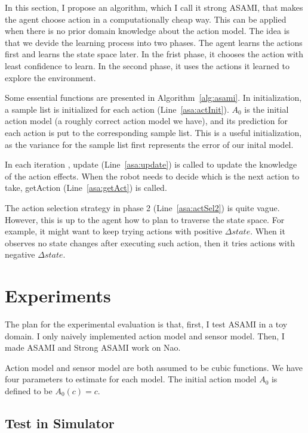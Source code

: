 \documentclass[10pt]{IEEEtran}
\begin{document}
In this section, I propose an algorithm, which I call it strong ASAMI,
that makes the agent choose action in a computationally cheap way.
This can be applied when there is no prior domain knowledge about
the action model. The idea is that we devide the learning process into two
phases. The agent learns the actions first and learns the state space
later. In the frist phase, it chooses the action with least confidence
to learn. In the second phase, it uses the actions it learned to
explore the environment.

Some essential functions are presented in Algorithm~\ref{alg:asami}.
In initialization, a sample list is initialized for each action
(Line~\ref{asa:actInit}). $A_0$ is the initial action model (a roughly
correct action model we have), and its prediction for each action is
put to the corresponding sample list.  This is a useful
initialization, as the variance for the sample list first represents
the error of our inital model.

In each iteration , update (Line~\ref{asa:update}) is called to update
the knowledge of the action effects. When the robot needs to decide which
is the next action to take, getAction (Line~\ref{asa:getAct}) is
called.

The action selection strategy in phase 2 (Line~\ref{asa:actSel2}) is
quite vague. However, this is up to the agent how to plan to traverse
the state space. For example, it might want to keep trying actions
with positive $\Delta state$. When it observes no state changes after
executing such action, then it tries actions with negative $\Delta
state$.

\section{Experiments}

The plan for the experimental evaluation is that, first, I test ASAMI
in a toy domain. I only naively implemented action model and sensor
model. Then, I made ASAMI and Strong ASAMI work on Nao.

Action model and sensor model are both assumed to be cubic functions.
We have four parameters to estimate for each model. The initial action
model $A_0$ is defined to be $A_0(c) = c$.

\subsection{Test in Simulator}
\end{document}
